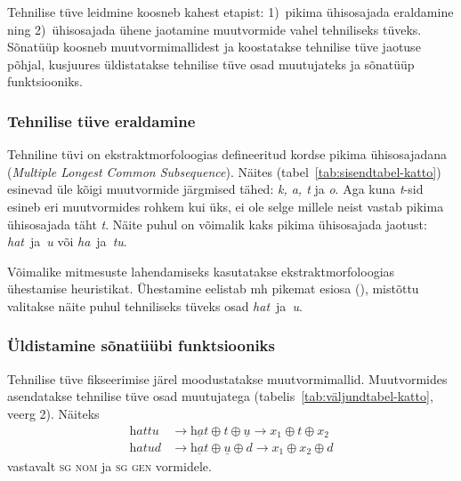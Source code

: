 \documentclass[12pt,a4paper]{article}
\newcommand{\vadja}[1]{\textit{#1}}
\newcommand{\msd}[1]{\textsc{#1}}
\begin{document}
Tehnilise tüve leidmine koosneb kahest etapist: 1)~pikima ühisosajada eraldamine ning 2)~ühisosajada ühene jaotamine muutvormide vahel tehniliseks tüveks. Sõnatüüp koosneb muutvormimallidest ja koostatakse tehnilise tüve jaotuse põhjal, kusjuures üldistatakse tehnilise tüve osad muutujateks ja sõnatüüp funktsiooniks.


\subsubsection{Tehnilise tüve eraldamine}

Tehniline tüvi on ekstraktmorfoloogias defineeritud kordse pikima ühisosajadana (\textit{Multiple Longest Common Subsequence}). %
Näites (tabel~\ref{tab:sisendtabel-katto}) esinevad üle kõigi muutvormide järgmised tähed: \vadja{k, a, t} ja \vadja{o}. Aga kuna \textit{t}-sid esineb eri muutvormides rohkem kui üks, ei ole selge millele neist vastab pikima ühisosajada täht \textit{t}.  Näite puhul on võimalik kaks pikima ühisosajada jaotust: \textit{hat}~ja~\textit{u} või \textit{ha}~ja~\textit{tu}.

Võimalike mitmesuste lahendamiseks kasutatakse ekstraktmorfoloogias ühestamise heuristikat. %
Ühestamine eelistab mh pikemat esiosa (\cite[33]{hulden_generalizing_2014}), mistõttu valitakse näite puhul tehniliseks tüveks osad \textit{hat}~ja~\textit{u}.


\subsubsection{Üldistamine sõnatüübi funktsiooniks}

Tehnilise tüve fikseerimise järel moodustatakse muutvormi\-mallid. Muutvormides asendatakse tehnilise tüve osad muutujatega (tabelis~\ref{tab:väljundtabel-katto}, veerg 2). Näiteks
\begin{align*}
  \textit{hattu} &\rightarrow \underline{\textit{hat}} \oplus \textit{t} \oplus \underline{\textit{u}} \rightarrow x_1 \oplus t \oplus x_2 \nonumber \\
  \textit{hatud} &\rightarrow \underline{\textit{hat}} \oplus \underline{\textit{u}} \oplus \textit{d} \rightarrow x_1 \oplus x_2 \oplus d \nonumber
\end{align*}
vastavalt \msd{sg nom} ja \msd{sg gen} vormidele.
\end{document}
